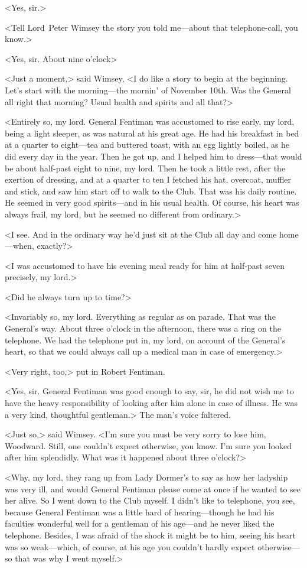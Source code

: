 <Yes, sir.>

<Tell Lord~Peter Wimsey the story you told me—about that telephone-call, you know.>

<Yes, sir. About nine o'clock\longdots>

<Just a moment,> said Wimsey, <I do like a story to begin at the beginning. Let's start with the morning—the mornin' of November 10th. Was the General all right that morning? Usual health and spirits and all that?>

<Entirely so, my lord. General Fentiman was accustomed to rise early, my lord, being a light sleeper, as was natural at his great age. He had his breakfast in bed at a quarter to eight—tea and buttered toast, with an egg lightly boiled, as he did every day in the year. Then he got up, and I helped him to dress—that would be about half-past eight to nine, my lord. Then he took a little rest, after the exertion of dressing, and at a quarter to ten I fetched his hat, overcoat, muffler and stick, and saw him start off to walk to the Club. That was his daily routine. He seemed in very good spirits—and in his usual health. Of course, his heart was always frail, my lord, but he seemed no different from ordinary.>

<I see. And in the ordinary way he'd just sit at the Club all day and come home—when, exactly?>

<I was accustomed to have his evening meal ready for him at half-past seven precisely, my lord.>

<Did he always turn up to time?>

<Invariably so, my lord. Everything as regular as on parade. That was the General's way. About three o'clock in the afternoon, there was a ring on the telephone. We had the telephone put in, my lord, on account of the General's heart, so that we could always call up a medical man in case of emergency.>

<Very right, too,> put in Robert Fentiman.

<Yes, sir. General Fentiman was good enough to say, sir, he did not wish me to have the heavy responsibility of looking after him alone in case of illness. He was a very kind, thoughtful gentleman.> The man's voice faltered.

<Just so,> said Wimsey. <I'm sure you must be very sorry to lose him, Woodward. Still, one couldn't expect otherwise, you know. I'm sure you looked after him splendidly. What was it happened about three o'clock?>

<Why, my lord, they rang up from Lady Dormer's to say as how her ladyship was very ill, and would General Fentiman please come at once if he wanted to see her alive. So I went down to the Club myself. I didn't like to telephone, you see, because General Fentiman was a little hard of hearing—though he had his faculties wonderful well for a gentleman of his age—and he never liked the telephone. Besides, I was afraid of the shock it might be to him, seeing his heart was so weak—which, of course, at his age you couldn't hardly expect otherwise—so that was why I went myself.>

